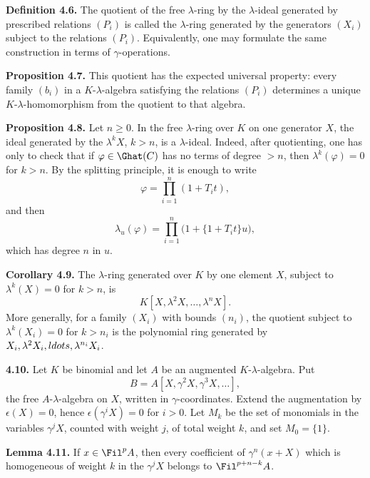 \textbf{Definition 4.6.} The quotient of the free \(\lambda\)-ring by the \(\lambda\)-ideal generated by prescribed relations \((P_i)\) is called the \(\lambda\)-ring generated by the generators \((X_i)\) subject to the relations \((P_i)\). Equivalently, one may formulate the same construction in terms of \(\gamma\)-operations.

\textbf{Proposition 4.7.} This quotient has the expected universal property: every family \((b_i)\) in a \(K\)-\(\lambda\)-algebra satisfying the relations \((P_i)\) determines a unique \(K\)-\(\lambda\)-homomorphism from the quotient to that algebra.

\textbf{Proposition 4.8.} Let \(n\ge0\). In the free \(\lambda\)-ring over \(K\) on one generator \(X\), the ideal generated by the \(\lambda^kX\), \(k>n\), is a \(\lambda\)-ideal. Indeed, after quotienting, one has only to check that if \(\varphi\in\Ghat(C)\) has no terms of degree \(>n\), then \(\lambda^k(\varphi)=0\) for \(k>n\). By the splitting principle, it is enough to write
\[
  \varphi=\prod_{i=1}^{n}(1+T_it),
\]
and then
\[
  \lambda_u(\varphi)=\prod_{i=1}^{n}\bigl(1+\{1+T_it\}u\bigr),
\]
which has degree \(n\) in \(u\).

\textbf{Corollary 4.9.} The \(\lambda\)-ring generated over \(K\) by one element \(X\), subject to \(\lambda^k(X)=0\) for \(k>n\), is
\[
  K[X,\lambda^2X,\ldots,\lambda^nX].
\]
More generally, for a family \((X_i)\) with bounds \((n_i)\), the quotient subject to \(\lambda^k(X_i)=0\) for \(k>n_i\) is the polynomial ring generated by \(X_i,\lambda^2X_i,\\ldots,\lambda^{n_i}X_i\).

\textbf{4.10.} Let \(K\) be binomial and let \(A\) be an augmented \(K\)-\(\lambda\)-algebra. Put
\[
  B=A[X,\gamma^2X,\gamma^3X,\ldots],
\]
the free \(A\)-\(\lambda\)-algebra on \(X\), written in \(\gamma\)-coordinates. Extend the augmentation by \(\epsilon(X)=0\), hence \(\epsilon(\gamma^iX)=0\) for \(i>0\). Let \(M_k\) be the set of monomials in the variables \(\gamma^jX\), counted with weight \(j\), of total weight \(k\), and set \(M_0=\{1\}\).

\textbf{Lemma 4.11.} If \(x\in\Fil^pA\), then every coefficient of \(\gamma^n(x+X)\) which is homogeneous of weight \(k\) in the \(\gamma^jX\) belongs to \(\Fil^{p+n-k}A\).

